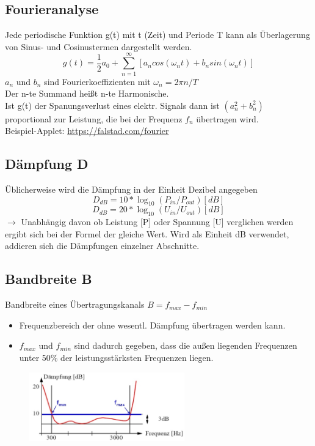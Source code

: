 \documentclass{scrreprt}
\begin{document}
\subsection*{Fourieranalyse}
\label{sec:fourier}
Jede periodische Funktion g(t) mit t (Zeit) und Periode T kann als Überlagerung
von Sinus- und Cosinustermen dargestellt werden.
$$g(t)=\frac{1}{2}a_{0}+\sum_{n=1}^{\infty}{[a_{n}cos(\omega_{n}t)+b_{n}sin(\omega_{n}t)]}$$
$a_{n}$ und $b_{n}$ sind Fourierkoeffizienten mit $\omega_{n}=2\pi n/T $
\\
Der n-te Summand heißt n-te Harmonische.
\\
Ist g(t) der Spanungsverlust eines elektr. Signals dann ist $(a_{n}^{2}+b_{n}^{2})$ proportional
zur Leistung, die bei der Frequenz $f_{n}$ übertragen wird.
\\
Beispiel-Applet: \url{https://falstad.com/fourier}

\subsection*{Dämpfung D}
\label{sec:dampf}
Üblicherweise wird die Dämpfung in der Einheit Dezibel angegeben
$$D_{dB}=10*\log_{10}(P_{in}/P_{out})  [dB]$$
$$D_{dB}=20*\log_{10}(U_{in}/U_{out})  [dB]$$
$\rightarrow$   Unabhängig davon ob Leistung [P] oder Spannung [U] verglichen werden
ergibt sich bei der Formel der gleiche Wert.
Wird als Einheit dB verwendet, addieren sich die Dämpfungen einzelner Abschnitte.

\subsection*{Bandbreite B}
\label{sec:bandbreite}
Bandbreite eines Übertragungskanals $B = f_{max}-f_{min}$
\begin{itemize}
	\item Frequenzbereich der ohne wesentl. Dämpfung übertragen werden kann.
	\item $f_{max}$ und $f_{min}$ sind dadurch gegeben, dass die außen liegenden Frequenzen
	      unter 50\% der leistungsstärksten Frequenzen liegen.
\end{itemize}
\begin{figure}[h]
	\includegraphics[width=0.60\textwidth]{"graphics/Dampfung"}
	\centering
\end{figure}
\end{document}
